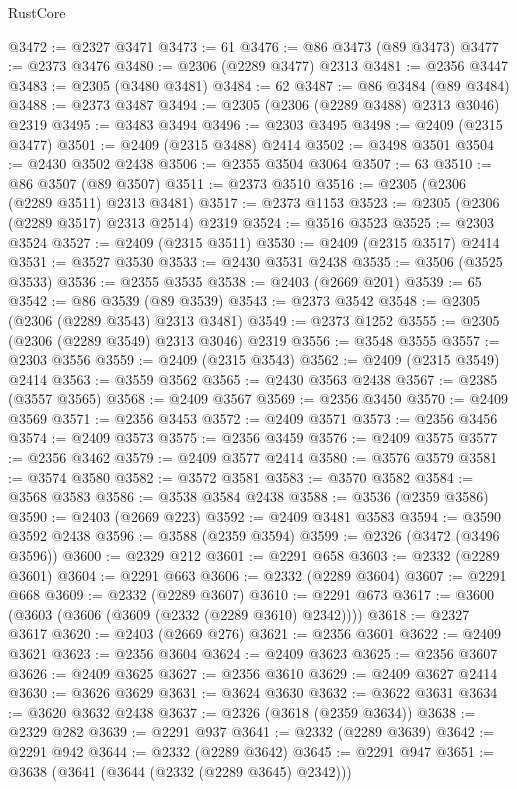 \begin{lexlean}{RustCore}
\begin{coremodule}
@3472 := @2327 @3471
@3473 := 61
@3476 := @86 @3473 (@89 @3473)
@3477 := @2373 @3476
@3480 := @2306 (@2289 @3477) @2313
@3481 := @2356 @3447
@3483 := @2305 (@3480 @3481)
@3484 := 62
@3487 := @86 @3484 (@89 @3484)
@3488 := @2373 @3487
@3494 := @2305 (@2306 (@2289 @3488) @2313 @3046) @2319
@3495 := @3483 @3494
@3496 := @2303 @3495
@3498 := @2409 (@2315 @3477)
@3501 := @2409 (@2315 @3488) @2414
@3502 := @3498 @3501
@3504 := @2430 @3502 @2438
@3506 := @2355 @3504 @3064
@3507 := 63
@3510 := @86 @3507 (@89 @3507)
@3511 := @2373 @3510
@3516 := @2305 (@2306 (@2289 @3511) @2313 @3481)
@3517 := @2373 @1153
@3523 := @2305 (@2306 (@2289 @3517) @2313 @2514) @2319
@3524 := @3516 @3523
@3525 := @2303 @3524
@3527 := @2409 (@2315 @3511)
@3530 := @2409 (@2315 @3517) @2414
@3531 := @3527 @3530
@3533 := @2430 @3531 @2438
@3535 := @3506 (@3525 @3533)
@3536 := @2355 @3535
@3538 := @2403 (@2669 @201)
@3539 := 65
@3542 := @86 @3539 (@89 @3539)
@3543 := @2373 @3542
@3548 := @2305 (@2306 (@2289 @3543) @2313 @3481)
@3549 := @2373 @1252
@3555 := @2305 (@2306 (@2289 @3549) @2313 @3046) @2319
@3556 := @3548 @3555
@3557 := @2303 @3556
@3559 := @2409 (@2315 @3543)
@3562 := @2409 (@2315 @3549) @2414
@3563 := @3559 @3562
@3565 := @2430 @3563 @2438
@3567 := @2385 (@3557 @3565)
@3568 := @2409 @3567
@3569 := @2356 @3450
@3570 := @2409 @3569
@3571 := @2356 @3453
@3572 := @2409 @3571
@3573 := @2356 @3456
@3574 := @2409 @3573
@3575 := @2356 @3459
@3576 := @2409 @3575
@3577 := @2356 @3462
@3579 := @2409 @3577 @2414
@3580 := @3576 @3579
@3581 := @3574 @3580
@3582 := @3572 @3581
@3583 := @3570 @3582
@3584 := @3568 @3583
@3586 := @3538 @3584 @2438
@3588 := @3536 (@2359 @3586)
@3590 := @2403 (@2669 @223)
@3592 := @2409 @3481 @3583
@3594 := @3590 @3592 @2438
@3596 := @3588 (@2359 @3594)
@3599 := @2326 (@3472 (@3496 @3596))
@3600 := @2329 @212
@3601 := @2291 @658
@3603 := @2332 (@2289 @3601)
@3604 := @2291 @663
@3606 := @2332 (@2289 @3604)
@3607 := @2291 @668
@3609 := @2332 (@2289 @3607)
@3610 := @2291 @673
@3617 := @3600 (@3603 (@3606 (@3609 (@2332 (@2289 @3610) @2342))))
@3618 := @2327 @3617
@3620 := @2403 (@2669 @276)
@3621 := @2356 @3601
@3622 := @2409 @3621
@3623 := @2356 @3604
@3624 := @2409 @3623
@3625 := @2356 @3607
@3626 := @2409 @3625
@3627 := @2356 @3610
@3629 := @2409 @3627 @2414
@3630 := @3626 @3629
@3631 := @3624 @3630
@3632 := @3622 @3631
@3634 := @3620 @3632 @2438
@3637 := @2326 (@3618 (@2359 @3634))
@3638 := @2329 @282
@3639 := @2291 @937
@3641 := @2332 (@2289 @3639)
@3642 := @2291 @942
@3644 := @2332 (@2289 @3642)
@3645 := @2291 @947
@3651 := @3638 (@3641 (@3644 (@2332 (@2289 @3645) @2342)))

\end{coremodule}
\end{lexlean}
